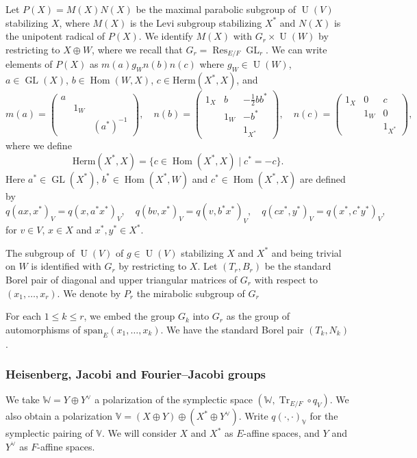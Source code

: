 \documentclass[letterpaper,11pt]{amsart}
\newcommand{\bW}{\mathbb{W}}
\newcommand{\bV}{\mathbb{V}}
\newcommand{\<}{\negthickspace}
\DeclareMathOperator{\Tr}{Tr}
\DeclareMathOperator{\GL}{GL}
\DeclareMathOperator{\U}{U}
\DeclareMathOperator{\Res}{Res}
\DeclareMathOperator{\Hom}{Hom}
\theoremstyle{definition}
\theoremstyle{plain}
\theoremstyle{remark}
\numberwithin{equation}{section}
\begin{document}
Let $P(X)=M(X)N(X)$ be the maximal parabolic subgroup of $\U(V)$ stabilizing $X$, where $M(X)$ is the Levi subgroup stabilizing $X^*$ and $N(X)$ is the unipotent radical of $P(X)$. We identify $M(X)$ with $G_r \times \U(W)$ by restricting to $X \oplus W$, where we recall that $G_r=\Res_{E/F} \GL_r$. We can write elements of $P(X)$ as $m(a) g_W  n(b) n(c)$ where $g_W \in
\U(W)$, $a \in \GL(X)$, $b \in \Hom(W, X)$, $c \in \mathrm{Herm}(X^*, X)$, and
    \[
    m(a) = \begin{pmatrix} a \\ & 1_{W} \\ && (a^*)^{-1} \end{pmatrix},
    \quad
    n(b) = \begin{pmatrix} 1_{X} & b & -\frac{1}{2} b b^* \\
    & 1_{W} & -b^* \\ && 1_{X^*} \end{pmatrix},
    \quad
    n(c) = \begin{pmatrix} 1_{X} & 0 &c \\ & 1_{W} & 0 \\
    && 1_{X^*} \end{pmatrix},
    \]
where we define
    \begin{equation}
        \label{eq:Herm_defi}
    \mathrm{Herm}(X^*, X) = \{ c \in \Hom(X^*, X) \mid c^* = -c \}.
    \end{equation}
Here $a^* \in \GL(X^*)$, $b^* \in \Hom(X^*, W)$ and $c^* \in
\Hom(X^*, X)$ are defined by
    \[
    q( ax, x^*)_{V} = q(x, a^* x^* )_{V}, \quad
    q(b v, x^*)_{V} = q( v, b^* x^*)_V, \quad
    q( c x^*, y^* )_V = q( x^*, c^* y^* )_V,
    \]
for $v \in V$, $x \in X$ and $x^*, y^* \in X^*$.

The subgroup of $\U(V)$ of $g \in \U(V)$ stabilizing $X$ and $X^*$ and being trivial on $W$ is identified with $G_r$ by restricting to $X$. Let $(T_r,B_r)$ be the standard Borel pair of diagonal and upper triangular matrices of $G_r$ with respect to $(x_1,\hdots,x_r)$. We denote by $P_r$ the mirabolic subgroup of $G_r$

For each $1 \leq k \leq r$, we embed the group $G_k$ into $G_r$ as the group of automorphisms of $\mathrm{span}_E(x_1,\hdots,x_k)$. We have the standard Borel pair $(T_k,N_k)$.

\subsubsection{Heisenberg, Jacobi and Fourier--Jacobi groups}
We take $\bW=Y\oplus Y^\vee$ a polarization of the symplectic space $(\bW,\Tr_{E/F} \circ q_V)$. We also obtain a polarization $\bV=(X \oplus Y) \oplus (X^* \oplus Y^\vee)$. Write $q(\cdot,\cdot)_\bV$ for the symplectic pairing of $\bV$. We will consider $X$ and $X^*$ as $E$-affine spaces, and $Y$ and $Y^\vee$ as $F$-affine spaces. 
\end{document}
